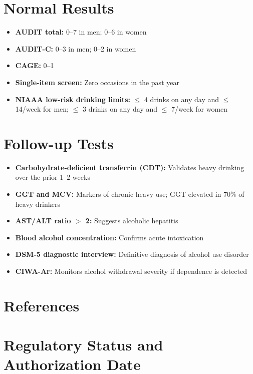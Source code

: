 \section*{Normal Results}
\begin{itemize}
  \item \textbf{AUDIT total:} 0--7 in men; 0--6 in women
  \item \textbf{AUDIT-C:} 0--3 in men; 0--2 in women
  \item \textbf{CAGE:} 0--1
  \item \textbf{Single-item screen:} Zero occasions in the past year
  \item \textbf{NIAAA low-risk drinking limits:} $\leq$ 4 drinks on any day and $\leq$ 14/week for men; $\leq$ 3 drinks on any day and $\leq$ 7/week for women
\end{itemize}

\section*{Follow-up Tests}
\begin{itemize}
  \item \textbf{Carbohydrate-deficient transferrin (CDT):} Validates heavy drinking over the prior 1--2 weeks
  \item \textbf{GGT and MCV:} Markers of chronic heavy use; GGT elevated in 70\% of heavy drinkers
  \item \textbf{AST/ALT ratio $>$ 2:} Suggests alcoholic hepatitis
  \item \textbf{Blood alcohol concentration:} Confirms acute intoxication
  \item \textbf{DSM-5 diagnostic interview:} Definitive diagnosis of alcohol use disorder
  \item \textbf{CIWA-Ar:} Monitors alcohol withdrawal severity if dependence is detected
\end{itemize}

\section*{References}



\clearpage
\section*{Regulatory Status and Authorization Date}

\clearpage
